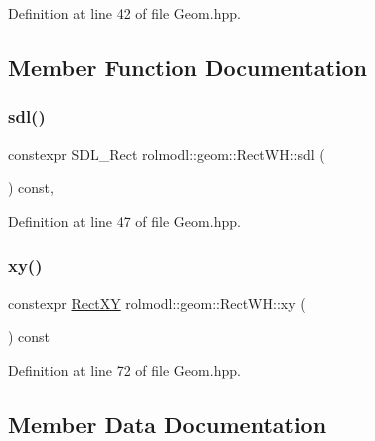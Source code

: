 Definition at line 42 of file Geom.\+hpp.



\subsection{Member Function Documentation}
\mbox{\label{structrolmodl_1_1geom_1_1_rect_w_h_a9bd269b0d7d081baf77de37b80c0c59a}} 
\subsubsection{\texorpdfstring{sdl()}{sdl()}}
{\footnotesize\ttfamily constexpr S\+D\+L\+\_\+\+Rect rolmodl\+::geom\+::\+Rect\+W\+H\+::sdl (\begin{DoxyParamCaption}{ }\end{DoxyParamCaption}) const\hspace{0.3cm}{\ttfamily [inline]}, {\ttfamily [noexcept]}}



Definition at line 47 of file Geom.\+hpp.

\mbox{\label{structrolmodl_1_1geom_1_1_rect_w_h_aa4f1d9f3ff2d3f082f0c53ddf193f502}} 
\subsubsection{\texorpdfstring{xy()}{xy()}}
{\footnotesize\ttfamily constexpr \mbox{\hyperlink{structrolmodl_1_1geom_1_1_rect_x_y}{Rect\+XY}} rolmodl\+::geom\+::\+Rect\+W\+H\+::xy (\begin{DoxyParamCaption}{ }\end{DoxyParamCaption}) const\hspace{0.3cm}{\ttfamily [noexcept]}}



Definition at line 72 of file Geom.\+hpp.



\subsection{Member Data Documentation}
\mbox{\label{structrolmodl_1_1geom_1_1_rect_w_h_ab657f01f57146900006eaf55e66bf304}} 
